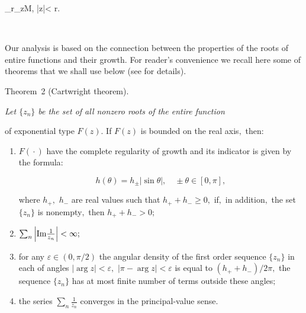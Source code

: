 \lim\limits_{r\to\infty}\sum\limits_{z\in M, |z|< r}.

$$



Our analysis is based on the connection between the properties of the roots of entire functions and their growth. For reader's convenience we recall here some of theorems that we shall use below (see \cite{ign:13, ign:14}  for details).



\smallskip



\hypertarget{ign:th2}{}



{\small \sc Theorem~2 (Cartwright theorem).} {\it Let $\{z_n\}$ be the set of all nonzero roots of the entire function

of exponential type $F(z).$ If $F(z)$ is bounded on the real axis$,$ then${:}$

 \begin{enumerate}

   \item[\rm 1)] $F({}\cdot{})$ have the complete regularity of growth and its  indicator is given by the formula{\rm:}

   $$h(\theta)=h_\pm |\sin\theta|, \quad \pm\theta\in[0,\pi],$$

   where $h_+,$ $ h_-$ are real values such that $h_+ +h_-\geq 0,$ if$,$ in addition$,$ the set $\{z_n\}$ is nonempty$,$ then $h_+ +h_->0;$

   \item[\rm 2)] $\sum_n \left|\mbox{\rm Im}\frac{1}{z_n}\right|<\infty;$

   \item[\rm 3)] for any $\varepsilon\in(0,\pi/2)$ the angular density of the first order sequence $\{z_n\}$ in each of angles $|\arg z|<\varepsilon,$ $|\pi-\arg z|<\varepsilon$ is equal to $(h_+ +h_-)/2\pi,$ the sequence $\{z_n\}$ has at most finite number of terms outside these angles$;$

   \item[\rm 4)] the series $\sum_n \frac{1}{z_n}$ converges in the principal-value sense$.$

 \end{enumerate}

 }



\smallskip



\hypertarget{ign:th3}{}



